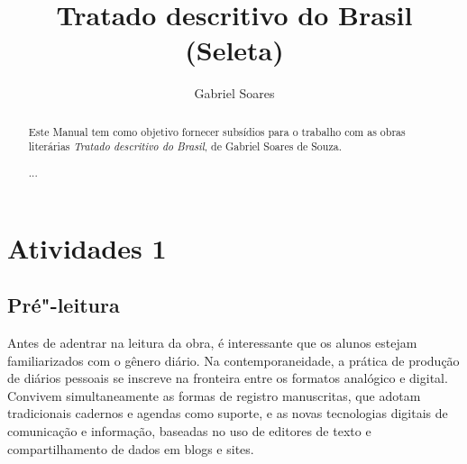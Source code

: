 \documentclass[12pt]{extarticle}
\begin{document}
\newcommand{\AutorLivro}{Gabriel Soares}
\newcommand{\TituloLivro}{Tratado descritivo do Brasil (Seleta)}
\newcommand{\Tema}{Diálogos com a sociologia e com a antropologia}
\newcommand{\Genero}{Diário, biografia, autobiografia, relatos, memórias}
\newcommand{\imagemCapa}{./images/PNLD0015-01.png}
\newcommand{\issnppub}{---}
\newcommand{\issnepub}{---}
\newcommand{\colaborador}{\textbf{Bruno Gradella e Vicente Castro} é uma pessoa incrível e vai fazer um bom serviço.}

{}
\title{\TituloLivro}
\author{\AutorLivro}
\def\authornotes{\colaborador}

\date{}
\maketitle

\begin{abstract}
Este Manual tem como objetivo fornecer subsídios para o trabalho com as
obras literárias \emph{Tratado descritivo do Brasil}, de Gabriel Soares
de Souza.

...
\end{abstract}

\tableofcontents

	
\section{Atividades 1}


\subsection{Pré"-leitura}


Antes de adentrar na leitura da obra, é interessante que os
alunos estejam familiarizados com o gênero diário. Na contemporaneidade,
a prática de produção de diários pessoais se inscreve na fronteira entre
os formatos analógico e digital. Convivem simultaneamente as formas de
registro manuscritas, que adotam tradicionais cadernos e agendas como
suporte, e as novas tecnologias digitais de comunicação e informação,
baseadas no uso de editores de texto e compartilhamento de dados em
blogs e sites.
\end{document}
